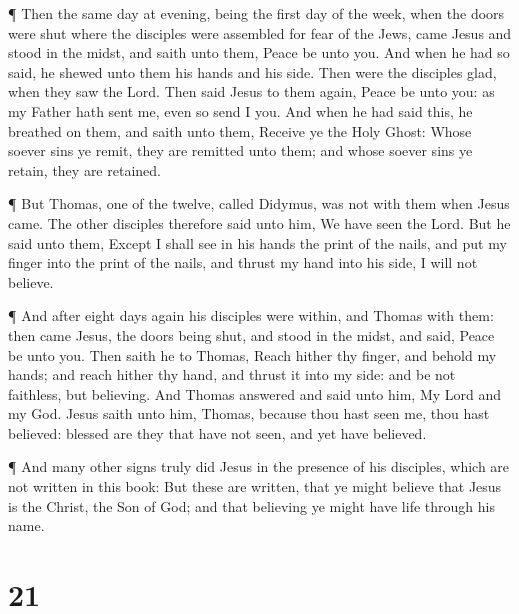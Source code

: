  ¶ Then the same day at evening, being the first day of the
week, when the doors were shut where the disciples were assembled for
fear of the Jews, came Jesus and stood in the midst, and saith unto
them, Peace be unto you.  And when he had so said, he
shewed unto them his hands and his side. Then were the disciples glad,
when they saw the Lord.  Then said Jesus to them again,
Peace be unto you: as my Father hath sent me, even so send I you.
 And when he had said this, he breathed on them, and saith
unto them, Receive ye the Holy Ghost:  Whose soever sins ye
remit, they are remitted unto them; and whose soever sins ye retain,
they are retained.

 ¶ But Thomas, one of the twelve, called Didymus, was not
with them when Jesus came.  The other disciples therefore
said unto him, We have seen the Lord. But he said unto them, Except I
shall see in his hands the print of the nails, and put my finger into
the print of the nails, and thrust my hand into his side, I will not
believe.

 ¶ And after eight days again his disciples were within,
and Thomas with them: then came Jesus, the doors being shut, and stood
in the midst, and said, Peace be unto you.  Then saith he
to Thomas, Reach hither thy finger, and behold my hands; and reach
hither thy hand, and thrust it into my side: and be not faithless, but
believing.  And Thomas answered and said unto him, My Lord
and my God.  Jesus saith unto him, Thomas, because thou
hast seen me, thou hast believed: blessed are they that have not seen,
and yet have believed.

 ¶ And many other signs truly did Jesus in the presence of
his disciples, which are not written in this book:  But
these are written, that ye might believe that Jesus is the Christ, the
Son of God; and that believing ye might have life through his name.

\hypertarget{section-20}{%
\section{21}\label{section-20}}

